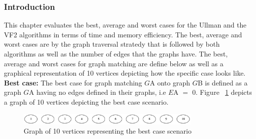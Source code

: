 
\subsubsection{Introduction}
This chapter evaluates the best, average and worst cases for the Ullman and the VF2 algorithms in terms of time and memory efficiency. The best, average and worst cases are by the graph traversal stratedy that is followed by both algorithms as well as the number of edges that the graphs have.\newline\newline
The best, average and worst cases for graph matching are define below as well as a graphical representation of 10 vertices depicting how the specific case looks like.\newline\newline
\textbf{Best case:} The best case for graph matching $G${\tiny A} onto graph $G${\tiny B} is defined as a graph $G${\tiny A} having no 
edges defined in their graphs, i.e $E${\tiny A} $=$ 0. 
Figure ~\ref{fig:best} depicts a graph of 10 vertices depicting the best case scenario.
\begin{figure}[H]
  \begin{center}
      \includegraphics[width=0.8\textwidth]{best.png}
  \end{center}    
  \caption{Graph of 10 vertices representing the best case scenario}
  \label{fig:best}
\end{figure} 

